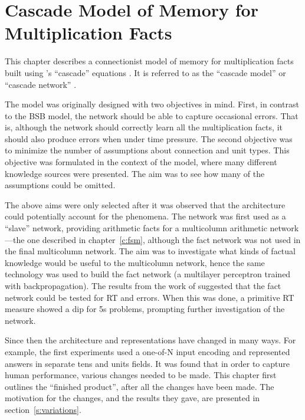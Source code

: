 
\chapter%
[Cascade model of memory for multiplication facts]%
{Cascade Model of Memory for Multiplication Facts}

\label{c:xnet}

This chapter describes a connectionist model of memory for multiplication
facts built using \citeauthor{mccascade}'s ``cascade'' equations
\cite{mccascade,pdp3}.  It is referred to as the ``cascade model'' or
``cascade network'' \cite<no relation to cascade correlation,>{cascor}.

The model was originally designed with two objectives in mind. First, in
contrast to the BSB model, the network should be able to capture occasional
errors.  That is, although the network should correctly learn all the
multiplication facts, it should also produce errors when under time
pressure.  The second objective was to minimize the number of assumptions
about connection and unit types.  This objective was formulated in the
context of the  model, where many different knowledge
sources were presented.  The aim was to see how many of the assumptions
could be omitted.

The above aims were only selected after it was observed that the
architecture could potentially account for the phenomena.  The network
was first used as
a ``slave'' network, providing arithmetic facts for a
multicolumn arithmetic network---the one described in chapter~\ref{c:fsm},
although the fact network was not used in the final multicolumn network.
The aim was to investigate what kinds of factual knowledge would be useful
to the multicolumn network, hence the same technology was used to build the
fact network (a multilayer perceptron trained with backpropagation).
The results from the work of  suggested that the fact network
could be tested for RT and errors. When this was done, a primitive RT
measure showed a dip for 5s problems, prompting further investigation of
the network.

Since then the architecture and representations have changed in many ways.
For example, the first experiments used a one-of-N input encoding and
represented answers in separate tens and units fields.  It was found that
in order to capture human performance, various changes needed to be made.
This chapter first outlines the ``finished product'', after all the changes
have been made. The motivation for the changes, and the results they gave,
are presented in section~\ref{s:variations}.

